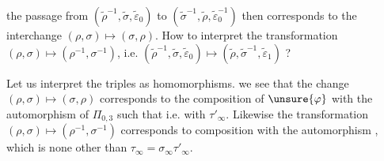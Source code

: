 


the passage from $(\widetilde\rho^{-1},\widetilde\sigma,\widetilde\varepsilon_0)$ to $(\widetilde\sigma^{-1},\widetilde\rho,\widetilde\varepsilon_0^{-1})$ then corresponds to the interchange $(\rho,\sigma)\mapsto(\sigma,\rho)$. How  to interpret the transformation $(\rho,\sigma)\mapsto(\rho^{-1},\sigma^{-1})$, i.e. $(\widetilde\rho^{-1},\widetilde\sigma,\widetilde\varepsilon_0)\mapsto(\widetilde\rho,\widetilde\sigma^{-1},\widetilde\varepsilon_1)$ ?

Let us interpret the triples as homomorphisms.
we see that the change $(\rho,\sigma)\mapsto(\sigma,\rho)$ corresponds to the composition of $\unsure{\varphi}$ with the automorphism of $\Pi_{0,3}$ such that
i.e. with \uline{$\tau'_\infty$}. Likewise the transformation $(\rho,\sigma)\mapsto(\rho^{-1},\sigma^{-1})$ corresponds to composition with the automorphism
,
which is none other than \uline{$\tau_\infty$}$=\sigma_\infty\tau'_\infty$.


